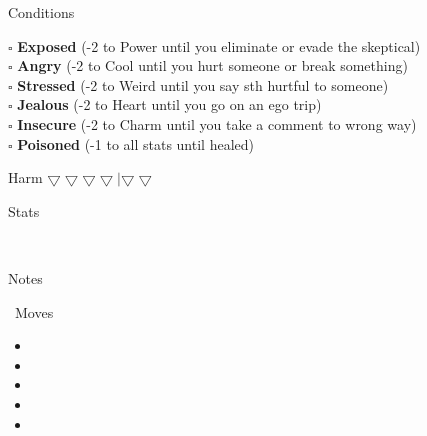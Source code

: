 \medskip

\Large{}Conditions

\medskip

\normalfont\large

\(\square\) \textbf{Exposed} (-2 to Power until you eliminate or evade the skeptical)\\
\(\square\) \textbf{Angry} (-2 to Cool until you hurt someone or break something)\\
\(\square\) \textbf{Stressed} (-2 to Weird until you say sth hurtful to someone)\\
\(\square\) \textbf{Jealous} (-2 to Heart until you go on an ego trip)\\
\(\square\) \textbf{Insecure} (-2 to Charm until you take a comment to wrong way)\\
\(\square\) \textbf{Poisoned}  (-1 to all stats until healed)

\medskip

\Large{}Harm \(\bigtriangledown \bigtriangledown \bigtriangledown \bigtriangledown | \bigtriangledown \bigtriangledown\)

\medskip

\Large{}Stats

\normalfont\Huge

\faBomb~\textcolor{lightgray}{\faCircle[regular]} \hspace{0.5cm} \faStar~\textcolor{lightgray}{\faCircle[regular]} \hspace{0.5cm} \faHeart~\textcolor{lightgray}{\faCircle[regular]} \hspace{0.5cm} \faBrain~\textcolor{lightgray}{\faCircle[regular]} \hspace{0.5cm} \faPizzaSlice~\textcolor{lightgray}{\faCircle[regular]}

\medskip

\Large{}Notes

\newpage

\Large{}\playbookTitle~Moves

\medskip

\normalfont\large

\begin{itemize}[label=$\square$]

\item \moveOne

\item \moveTwo

\item \moveThree

\item \moveFour

\item \moveFive

\end{itemize}


